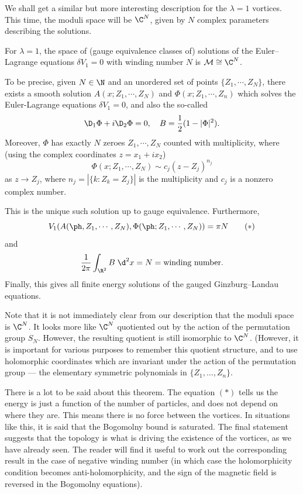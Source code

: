 \documentclass[a4paper]{article}
\begin{document}
We shall get a similar but more interesting description for the $\lambda = 1$ vortices. This time, the moduli space will be $\C^N$, given by $N$ complex parameters describing the solutions.

\begin{thm}
  For $\lambda = 1$, the space of (gauge equivalence classes of) solutions of the Euler--Lagrange equations $\delta V_1 = 0$ with winding number $N$ is $\mathcal{M} \cong \C^N$.

  To be precise, given $N \in \N$ and an unordered set of points $\{Z_1, \cdots, Z_N\}$, there exists a smooth solution $A(x; Z_1, \cdots, Z_N)$ and $\Phi(x; Z_1, \cdots, Z_n)$ which solves the Euler-Lagrange equations $\delta V_1 = 0$, and also the so-called 
  \[
    \D_1 \Phi + i \D_2 \Phi = 0, \quad B = \frac{1}{2} (1 - |\Phi|^2).
  \]
  Moreover, $\Phi$ has exactly $N$ zeroes $Z_1, \cdots, Z_N$ counted with multiplicity, where (using the complex coordinates $z = x_1 + ix_2$)
  \[
    \Phi(x; Z_1, \cdots, Z_N) \sim c_j (z - Z_j)^{n_j}
  \]
  as $z \to Z_j$, where $n_j = |\{k: Z_k = Z_j\}|$ is the multiplicity and $c_j$ is a nonzero complex number.

  This is the unique such solution up to gauge equivalence. Furthermore,
  \[
    V_1(A(\ph, Z_1, \cdots, Z_N), \Phi(\ph; Z_1, \cdots, Z_N)) = \pi N\tag{$*$}
  \]
  and
  \[
    \frac{1}{2\pi} \int_{\R^2} B\;\d^2 x = N = \text{winding number}.
  \]
  Finally, this gives all finite energy solutions of the gauged Ginzburg--Landau equations.
\end{thm}
Note that it is not immediately clear from our description that the moduli space is $\C^N$. It looks more like $\C^N$ quotiented out by the action of the permutation group $S_N$. However, the resulting quotient is still isomorphic to $\C^N$. (However, it is important for various purposes to remember this quotient structure, and to use holomorphic coordinates which are invariant under the action of the permutation group --- the elementary symmetric polynomials in $\{Z_1, \ldots, Z_n\}$.

There is a lot to be said about this theorem. The equation $(*)$ tells us the energy is just a function of the number of particles, and does not depend on where they are. This means there is no force between the vortices. In situations like this, it is said that the Bogomolny bound is saturated. The final statement suggests that the topology is what is driving the existence of the vortices, as we have already seen. The reader will find it useful to work out the corresponding result in the case of negative winding number (in which case the holomorphicity condition becomes anti-holomorphicity, and the sign of the magnetic field is reversed in the Bogomolny equations).
\end{document}
